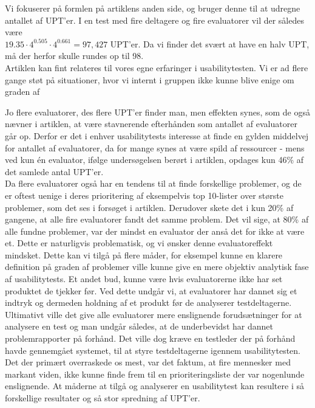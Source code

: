 \documentclass[12pt]{article}
\begin{document}
\noindent Vi fokuserer på formlen på artiklens anden side, og bruger denne til at udregne antallet af UPT'er. I en test med fire deltagere og fire evaluatorer vil der således være \\ 
$19.35 \cdot 4^{0.505} \cdot 4^{0.661} = 97,427$ UPT'er. Da vi finder det svært at have en halv UPT, må der herfor skulle rundes op til 98.\\

\noindent Artiklen kan fint relateres til vores egne erfaringer i usabilitytesten. Vi er ad flere gange støt på situationer, hvor vi internt i gruppen ikke kunne blive enige om graden af 

\noindent Jo flere evaluatorer, des flere UPT'er finder man, men effekten synes, som de også nævner i artiklen, at være stavnerende efterhånden som antallet af evaluatorer går op. Derfor er det i enhver usabilitytests interesse at finde en gylden middelvej for antallet af evaluatorer, da for mange synes at være spild af ressourcer - mens ved kun én evaluator, ifølge undersøgelsen berørt i artiklen, opdages kun 46\% af det samlede antal UPT'er.\\

\noindent Da flere evaluatorer også har en tendens til at finde forskellige problemer, og de er oftest uenige i deres prioritering af eksempelvis top 10-lister over største problemer, som det ses i forsøget i artiklen. Derudover skete det i kun 20\% af gangene, at alle fire evaluatorer fandt det samme problem. Det vil sige, at 80\% af alle fundne problemer, var der mindst en evaluator der anså det for ikke at være et. Dette er naturligvis problematisk, og vi ønsker denne evaluatoreffekt mindsket. Dette kan vi tilgå på flere måder, for eksempel kunne en klarere definition på graden af problemer ville kunne give en mere objektiv analytisk fase af usabilitytests. Et andet bud, kunne være hvis evaluatorerne ikke har set produktet de tjekker før. Ved dette undgår vi, at evaluatorer har dannet sig et indtryk og dermeden holdning af et produkt før de analyserer testdeltagerne. Ultimativt ville det give alle evaluatorer mere enslignende forudsætninger for at analysere en test og man undgår således, at de underbevidst har dannet problemrapporter på forhånd. Det ville dog kræve en testleder der på forhånd havde gennemgået systemet, til at styre testdeltagerne igennem usabilitytesten.\\

\noindent Det der primært overraskede os mest, var det faktum, at fire mennesker med markant viden, ikke kunne finde frem til en prioriteringsliste der var nogenlunde enslignende. At måderne at tilgå og analyserer en usabilitytest kan resultere i så forskellige resultater og så stor spredning af UPT'er.\\
\end{document}
